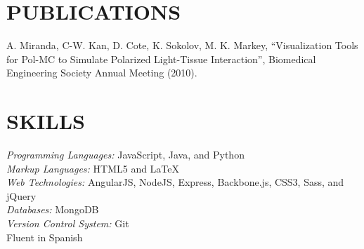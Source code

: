 \documentclass[line,margin,letterpaper]{res}
\begin{document}
\begin{resume}
 
\section{PUBLICATIONS} 
  A. Miranda, C-W. Kan, D. Cote, K. Sokolov, M. K. Markey, ``Visualization 
  Tools for Pol-MC to Simulate Polarized Light-Tissue Interaction'', 
  Biomedical Engineering Society Annual Meeting (2010).

\section{SKILLS}
  \emph{Programming Languages:} JavaScript, Java, and Python\\
  \emph{Markup Languages:} HTML5 and \LaTeX \\
  \emph{Web Technologies:} AngularJS, NodeJS, Express, Backbone.js, CSS3, Sass,
  and jQuery \\
  \emph{Databases:} MongoDB \\
  \emph{Version Control System:} Git \\
  Fluent in Spanish

\end{resume}
\end{document}
